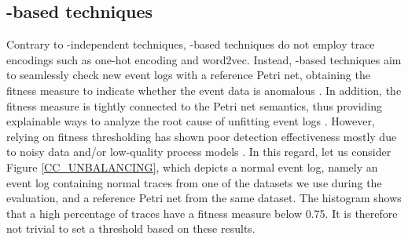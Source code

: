 \subsection{-based techniques}
Contrary to -independent techniques, -based techniques do not employ trace encodings such as one-hot encoding and word2vec. Instead, -based techniques aim to seamlessly check new event logs with a reference Petri net, obtaining the fitness measure to indicate whether the event data is anomalous \cite{bezerra2009pmad, accorsi2012pmsecurityaudits, bezerra2013adlogspais, myers2018icsadpm, pecchia2020applicationfailuresanalysispm}. In addition, the fitness measure is tightly connected to the Petri net semantics, thus providing explainable ways to analyze the root cause of unfitting event logs \cite{aalst2016pm}. However, relying on fitness thresholding has shown poor detection effectiveness mostly due to noisy data and/or low-quality process models \cite{bezerra2013adlogspais, pecchia2020applicationfailuresanalysispm}. In this regard, let us consider Figure \ref{CC_UNBALANCING}, which depicts a normal event log, namely an event log containing normal traces from one of the datasets we use during the evaluation, and a reference Petri net from the same dataset. The histogram shows that a high percentage of traces have a fitness measure below 0.75. It is therefore not trivial to set a threshold based on these results. 

